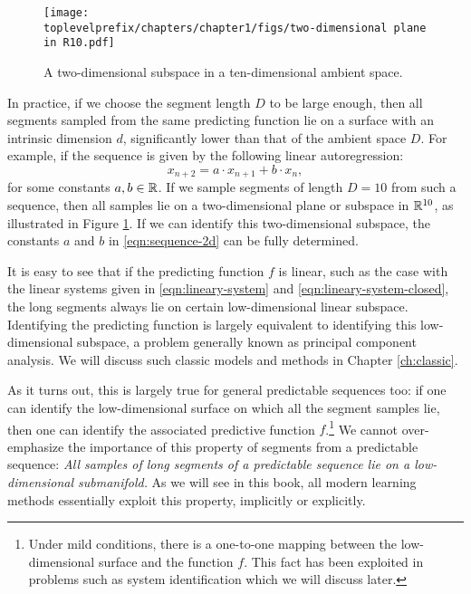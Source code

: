\documentclass[\toplevelprefix/book-main.tex]{subfiles}
\begin{document}
\begin{figure}[t]
\centering
\texttt{[image: \\toplevelprefix/chapters/chapter1/figs/two-dimensional plane in R10.pdf]}
    \caption{A two-dimensional subspace in a ten-dimensional ambient space.}
    \label{fig:lowdimplane}
\end{figure}
In practice, if we choose the segment length $D$ to be large enough, then all segments sampled from the same predicting function lie on a surface with an intrinsic dimension $d$, significantly lower than that of the ambient space $D$. For example, if the sequence is given by the following linear autoregression:
\begin{equation}
    x_{n+2} = a\cdot x_{n+1} + b\cdot x_n,
    \label{eqn:sequence-2d}
\end{equation}
for some constants $a, b \in \mathbb{R}$. If we sample segments of length $D =10$ from such a sequence, then all samples lie on a two-dimensional plane or subspace in $\mathbb{R}^{10}$, as illustrated in Figure \ref{fig:lowdimplane}. If we can identify this two-dimensional subspace, the constants $a$ and $b$ in \eqref{eqn:sequence-2d} can be fully determined. 


It is easy to see that if the predicting function $f$ is linear, such as the case with the linear systems given in \eqref{eqn:lineary-system} and \eqref{eqn:lineary-system-closed}, the long segments always lie on certain low-dimensional linear subspace. Identifying the predicting function is largely equivalent to identifying this low-dimensional subspace, a problem generally known as principal component analysis. We will discuss such classic models and methods in Chapter \ref{ch:classic}.

As it turns out, this is largely true for general predictable sequences too: if one can identify the low-dimensional surface on which all the segment samples lie, then one can identify the associated predictive function $f$.\footnote{Under mild conditions, there is a one-to-one mapping between the low-dimensional surface and the function $f$. This fact has been exploited in problems such as system identification which we will discuss later.} We cannot over-emphasize the importance of this property of segments from a predictable sequence: {\em All samples of long segments of a predictable sequence lie on a low-dimensional submanifold.} As we will see in this book, all modern learning methods essentially exploit this property, implicitly or explicitly. %
\end{document}
